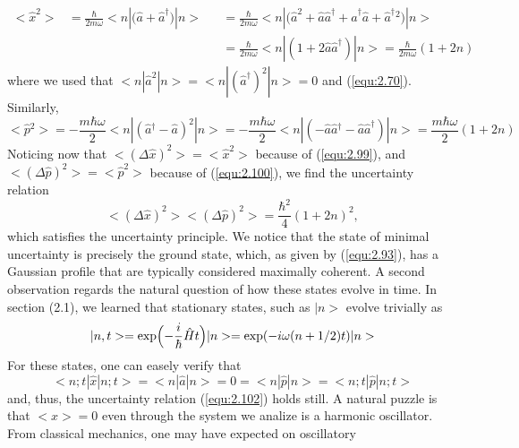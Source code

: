 \begin{subequations}
  \begin{alignat}{4}
    <\hat{x}^2> &= \frac{\hbar}{2m\omega}
    <n|\bigl(\hat{a}+\hat{a}^{\dagger}\bigr)|n> &&=
    \frac{\hbar}{2m\omega}<n|\bigl(\hat{a}^2 +
    \hat{a}\hat{a}^{\dagger} + \hat{a}^{\dagger}\hat{a} +
    \hat{a}^{\dagger}{}^2\bigr)|n> \nonumber \\
    &{} &&= \frac{\hbar}{2m\omega}<n|(1 +
    2\hat{a}\hat{a}^{\dagger})|n> =
    \frac{\hbar}{2m\omega}(1+2n) \label{equ:2.101}
  \end{alignat}
\end{subequations}
where we used that $<n|\hat{a}^2|n> =
<n|(\hat{a}^{\dagger})^2 | n> = 0$ and (\ref{equ:2.70}).
Similarly,
\begin{equation}
  <\hat{p}{}^2> = - \frac{m\hbar\omega}{2}
  <n|(\hat{a}{}^{\dagger}-\hat{a})^2 |n> =
  -\frac{m\hbar\omega}{2}
  <n|(-\hat{a}\hat{a}{}^{\dagger}-\hat{a}\hat{a}^{\dagger})|n>
  =
  \frac{m\hbar\omega}{2}(1+2n)
  \label{equ:2.102}
\end{equation}
Noticing now that $<(\Delta \hat{x})^2 > = <\hat{x}^2>$
because of (\ref{equ:2.99}), and $<(\Delta \hat{p})^2> =
<\hat{p}^2>$ because of (\ref{equ:2.100}), we find the
uncertainty relation
\begin{equation}
  <(\Delta \hat{x})^2 > < (\Delta \hat{p})^2> =
  \frac{\hbar^2}{4}(1+2n)^2,
  \label{equ:2.102}
\end{equation}
which satisfies the uncertainty principle. We notice that
the state of minimal uncertainty is precisely the ground
state, which, as given by (\ref{equ:2.93}), has a Gaussian
profile that are typically considered maximally coherent.
A second observation regards the natural question of how
these states evolve in time. In section (2.1),
we learned that stationary states, such as $|n>$ evolve
trivially as
\begin{equation}
  |n,t> = \exp\Bigl(-\frac{i}{\hbar}\hat{H}t\Bigr) |n> = \exp(-i\omega
  (n+1/2)t)|n>
  \label{equ:2.103}
\end{equation}
For these states, one can easely verify that
\begin{equation}
  <n;t|\hat{x}|n;t> = <n|\hat{a}|n> = 0 =
  <n|\hat{p}|n> = <n;t|\hat{p}|n;t>
  \label{equ:2.104}
\end{equation}
and, thus, the uncertainty relation (\ref{equ:2.102}) holds
still. A natural puzzle is that $<\hat{x}> = 0$ even through
the system we analize is a harmonic oscillator. From
classical mechanics, one may have expected on oscillatory
